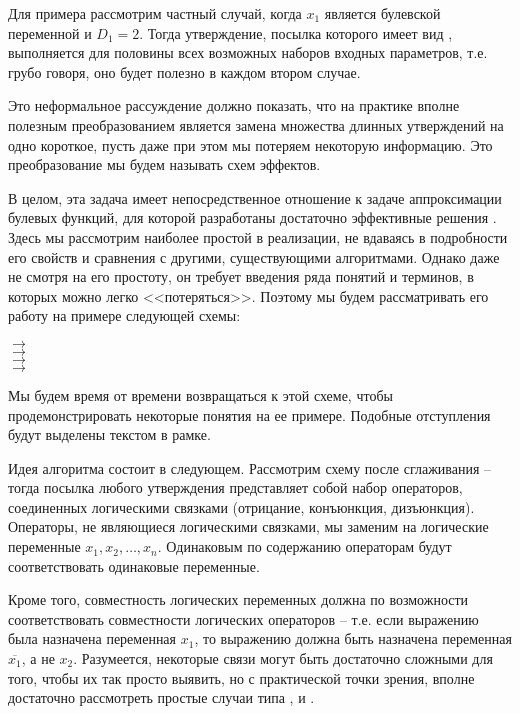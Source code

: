 Для примера рассмотрим частный случай, когда $x_1$ является булевской переменной и $D_1 = 2$. Тогда утверждение, посылка которого имеет вид , выполняется для половины всех возможных наборов входных параметров, т.е. грубо говоря, оно будет полезно в каждом втором случае. 

Это неформальное рассуждение должно показать, что на практике вполне полезным преобразованием является замена множества длинных утверждений на одно короткое, пусть даже при этом мы потеряем некоторую информацию. Это преобразование мы будем называть  схем эффектов.

В целом, эта задача имеет непосредственное отношение к задаче аппроксимации булевых функций, для которой разработаны достаточно эффективные решения \cite{Blais13}. Здесь мы рассмотрим наиболее простой в реализации, не вдаваясь в подробности его свойств и сравнения с другими, существующими алгоритмами. Однако даже не смотря на его простоту, он требует введения ряда понятий и терминов, в которых можно легко <<потеряться>>. Поэтому мы будем рассматривать его работу на примере следующей схемы:

{
	 $\rightarrow$  \\
	 $\rightarrow$  \\
	 $\rightarrow$  \\
	 $\rightarrow$ 
}
{}
\bigskip

Мы будем время от времени возвращаться к этой схеме, чтобы продемонстрировать некоторые понятия на ее примере. Подобные отступления будут выделены текстом в рамке.

\bigskip

Идея алгоритма состоит в следующем. Рассмотрим схему после сглаживания -- тогда посылка любого утверждения представляет собой набор операторов, соединенных логическими связками (отрицание, конъюнкция, дизъюнкция). Операторы, не являющиеся логическими связками, мы заменим на логические переменные $x_1, x_2, \ldots, x_n$. Одинаковым по содержанию операторам будут соответствовать одинаковые переменные. 

Кроме того, совместность логических переменных должна по возможности соответствовать совместности логических операторов -- т.е. если выражению  была назначена переменная $x_1$, то выражению  должна быть назначена переменная $\overline{x_1}$, а не $x_2$. Разумеется, некоторые связи могут быть достаточно сложными для того, чтобы их так просто выявить, но с практической точки зрения, вполне достаточно рассмотреть простые случаи типа , \code{==/!=} и .


